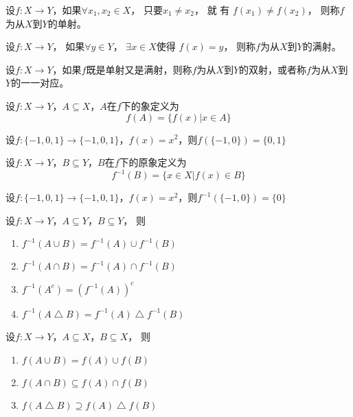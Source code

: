     \begin{Def}
    设$f:X\to Y$，如果$\forall x_1, x_2 \in X$， 只要$x_1 \neq x_2$，  就 有 $f(x_1) \neq f(x_2)$，   则称$f$为从$X$到$Y$的单射。
  \end{Def}
  \begin{Def}
    设$f:X\to Y$， 如果$\forall y \in Y$， $\exists x \in X$使得 $f(x) = y$， 则称$f$为从$X$到$Y$的满射。
  \end{Def}
  \begin{Def}
    设$f:X\to Y$，如果$f$既是单射又是满射，则称$f$为从$X$到$Y$的双射，或者称$f$为从$X$到$Y$的一一对应。
  \end{Def}
  \begin{Def}
    设$f:X\to Y$，$A \subseteq X$，$A$在$f$下的象定义为\[f(A)=\{f(x)|x\in A\}\]
  \end{Def}
  \begin{Example}
    设$f:\{-1,0,1\}\to \{-1,0,1\}$，$f(x)=x^2$，则$f(\{-1,0\})=\{0,1\}$
  \end{Example}
  \begin{Def}
    设$f:X\to Y$，$B \subseteq Y$，$B$在$f$下的原象定义为\[f^{-1}(B)=\{x\in X|f(x)\in B\}\]
  \end{Def}
  \begin{Example}
    设$f:\{-1,0,1\}\to \{-1,0,1\}$，$f(x)=x^2$，则$f^{-1}(\{-1,0\})=\{0\}$
  \end{Example}
  \begin{Thm}
    设$f:X\to Y$，$A \subseteq Y$，$B \subseteq Y$， 则
    \begin{enumerate}
    \item $f^{-1}(A \cup B) = f^{-1}(A) \cup f^{-1}(B)$
    \item $f^{-1}(A \cap B) = f^{-1}(A) \cap f^{-1}(B)$
    \item $f^{-1}(A^c)=(f^{-1}(A))^c$
    \item $f^{-1}(A \bigtriangleup B) = f^{-1}(A) \bigtriangleup f^{-1}(B)$
    \end{enumerate}
  \end{Thm}
    \begin{Thm}
    设$f:X\to Y$，$A \subseteq X$，$B \subseteq X$， 则
    \begin{enumerate}
    \item $f(A \cup B) = f(A) \cup f(B)$
    \item $f(A \cap B) \subseteq f(A) \cap f(B)$
    \item $f(A \bigtriangleup B) \supseteq f(A) \bigtriangleup f(B)$
    \end{enumerate}
  \end{Thm}

